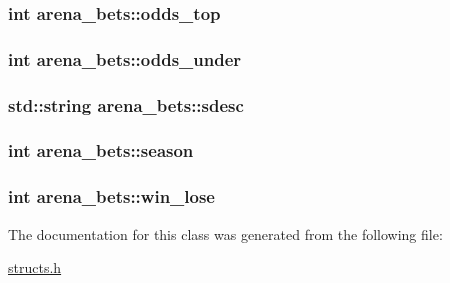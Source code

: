 \hypertarget{classarena__bets_a5598365011281b69cb364ac783aef13a}{
\subsubsection[{odds\-\_\-top}]{\setlength{\rightskip}{0pt plus 5cm}int arena\-\_\-bets\-::odds\-\_\-top}}\label{classarena__bets_a5598365011281b69cb364ac783aef13a}
\hypertarget{classarena__bets_a57b49a707822268cc9a8298563e6b3c7}{
\subsubsection[{odds\-\_\-under}]{\setlength{\rightskip}{0pt plus 5cm}int arena\-\_\-bets\-::odds\-\_\-under}}\label{classarena__bets_a57b49a707822268cc9a8298563e6b3c7}
\hypertarget{classarena__bets_a6aec66c48d66c112748e4469d5a0fa82}{
\subsubsection[{sdesc}]{\setlength{\rightskip}{0pt plus 5cm}std\-::string arena\-\_\-bets\-::sdesc}}\label{classarena__bets_a6aec66c48d66c112748e4469d5a0fa82}
\hypertarget{classarena__bets_a18d8189fc2f483d7b339b44f013659c1}{
\subsubsection[{season}]{\setlength{\rightskip}{0pt plus 5cm}int arena\-\_\-bets\-::season}}\label{classarena__bets_a18d8189fc2f483d7b339b44f013659c1}
\hypertarget{classarena__bets_a71a18e041b55a367a857bb32283604db}{
\subsubsection[{win\-\_\-lose}]{\setlength{\rightskip}{0pt plus 5cm}int arena\-\_\-bets\-::win\-\_\-lose}}\label{classarena__bets_a71a18e041b55a367a857bb32283604db}


The documentation for this class was generated from the following file\-:\begin{DoxyCompactItemize}
\item 
\hyperlink{structs_8h}{structs.\-h}\end{DoxyCompactItemize}
